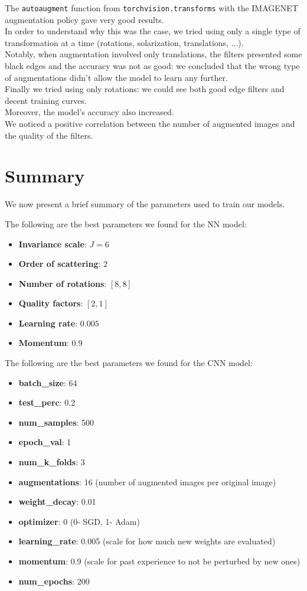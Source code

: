 \documentclass{report}
\begin{document}
The \texttt{autoaugment} function from \texttt{torchvision.transforms} with the IMAGENET augmentation policy gave very good results.\\
In order to understand why this was the case, we tried using only a single type of transformation at a time (rotations, solarization, translations, ...).\\
Notably, when augmentation involved only translations, the filters presented some black edges and the accuracy was not as good: we concluded that the wrong type of augmentations didn't allow the model to learn any further.\\

Finally we tried using only rotations: we could see both good edge filters and decent training curves.\\
Moreover, the model's accuracy also increased.\\
We noticed a positive correlation between the number of augmented images and the quality of the filters.\\



\section{Summary}
We now present a brief summary of the parameters used to train our models.

The following are the best parameters we found for the NN model:
\begin{itemize}
  \item \textbf{Invariance scale}: $J=6$
  \item \textbf{Order of scattering}: $2$
  \item \textbf{Number of rotations}: $[8, 8]$
  \item \textbf{Quality factors}: $[2, 1]$
  \item \textbf{Learning rate}: $0.005$ 
  \item \textbf{Momentum}: $0.9$
\end{itemize}

The following are the best parameters we found for the CNN model:
\begin{itemize}
  \item \textbf{batch\_size}: 64
  \item \textbf{test\_perc}: 0.2
  \item \textbf{num\_samples}: 500
  \item \textbf{epoch\_val}: 1
  \item \textbf{num\_k\_folds}: 3
  \item \textbf{augmentations}: 16 (number of augmented images per original image)
  \item \textbf{weight\_decay}: 0.01
  \item \textbf{optimizer}: 0 (0- SGD, 1- Adam)
  \item \textbf{learning\_rate}: 0.005 (scale for how much new weights are evaluated)
  \item \textbf{momentum}: 0.9 (scale for past experience to not be perturbed by new ones)
  \item \textbf{num\_epochs}: 200
\end{itemize}
\pagebreak
\end{document}

